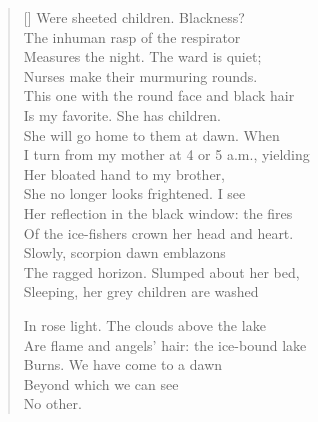 \begin{verse}[\versewidth]
Were sheeted children. Blackness?\\
The inhuman rasp of the respirator\\
Measures the night. The ward is quiet;\\
Nurses make their murmuring rounds.\\
This one with the round face and black hair\\
Is my favorite. She has children.\\
She will go home to them at dawn. When\\
I turn from my mother at 4 or 5 a.m., yielding\\
Her bloated hand to my brother,\\
She no longer looks frightened. I see\\
Her reflection in the black window: the fires\\
Of the ice-fishers crown her head and heart.\\
Slowly, scorpion dawn emblazons\\
The ragged horizon. Slumped about her bed,\\
Sleeping, her grey children are washed

In rose light. The clouds above the lake\\
Are flame and angels' hair: the ice-bound lake\\
Burns. We have come to a dawn\\
Beyond which we can see\\
No other.
\end{verse}
